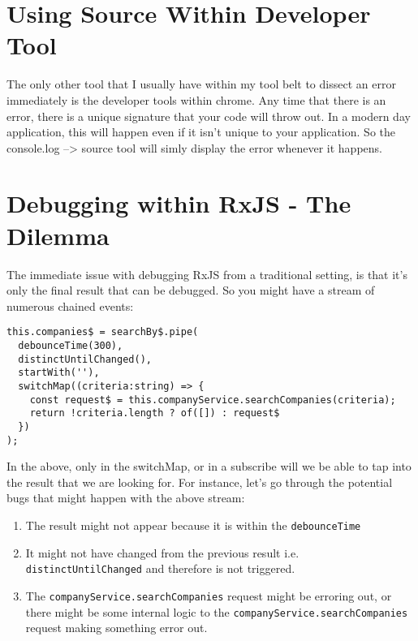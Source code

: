 
\section{Using Source Within Developer Tool}
The only other tool that I usually have within my tool belt to dissect an error immediately is the developer tools within chrome. Any time that there is an error, there is a unique signature that your code will throw out. In a modern day application, this will happen even if it isn't unique to your application. So the console.log --> source tool will simly display the error whenever it happens. 

\section{Debugging within RxJS - The Dilemma}
The immediate issue with debugging RxJS from a traditional setting, is that it's only the final result that can be debugged. So you might have a stream of numerous chained events: 
\begin{lstlisting}
this.companies$ = searchBy$.pipe(
  debounceTime(300),
  distinctUntilChanged(),
  startWith(''),      
  switchMap((criteria:string) => {
    const request$ = this.companyService.searchCompanies(criteria);
    return !criteria.length ? of([]) : request$          
  })
);  
\end{lstlisting}

In the above, only in the switchMap, or in a subscribe will we be able to tap into the result that we are looking for. For instance, let's go through the potential bugs that might happen with the above stream: 

\begin{enumerate}
  \item The result might not appear because it is within the \lstinline{debounceTime}
  \item It might not have changed from the previous result i.e. \lstinline{distinctUntilChanged} and therefore is not triggered.
  \item The \lstinline{companyService.searchCompanies} request might be erroring out, or there might be some internal logic to the \lstinline{companyService.searchCompanies} request making something error out.
\end{enumerate}

